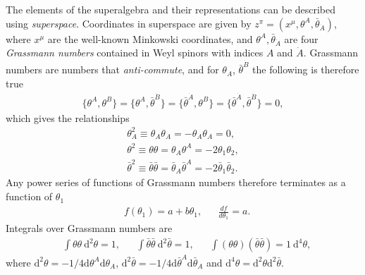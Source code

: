 \documentclass[twoside,english]{uiofysmaster}
\begin{document}
The elements of the superalgebra and their representations can be described using \textit{superspace}. Coordinates in superspace are given by $z^{\pi} = (x^{\mu}, \theta^A, \bar{\theta}_{\dot{A}})$, where $x^{\mu}$ are the well-known Minkowski coordinates, and $\theta^A, \bar{\theta}_{\dot{A}}$ are four \textit{Grassmann numbers} contained in Weyl spinors with indices $A$ and $\dot{A}$. Grassmann numbers are numbers that \textit{anti-commute}, and for $\theta_A$, $\bar{\theta}^{\dot{B}}$ the following is therefore true
\begin{align}
\{ \theta^A, \theta^B\} = \{ \theta^A, \bar{\theta}^{\dot{B}}\} = \{ \bar{\theta}^{\dot{A}}, \theta^B\} = \{ \bar{\theta}^{\dot{A}}, \bar{\theta}^{\dot{B}} \} =0,
\end{align}
which gives the relationships
\begin{align}
\theta_A^2 \equiv \theta_A \theta_A = - \theta_A \theta_A =  0,\\
\theta^2 \equiv \theta \theta = \theta_A \theta^A = -2 \theta_1 \theta_2,\\
\bar{\theta}^2 \equiv \bar{\theta} \bar{\theta} = \bar{\theta}_A \bar{\theta}^A = -2 \bar{\theta}_1 \bar{\theta}_2. 
\end{align}
Any power series of functions of Grassmann numbers therefore terminates as a function of $\theta_1$
\begin{align}
&f(\theta_1) = a + b \theta_1, && \frac{d f}{d \theta_1} = a.
\end{align}
Integrals over Grassmann numbers are 
\begin{align}
& \int \theta \theta~\mathrm{d}^2\theta=1, && \int \bar{\theta} \bar{\theta} ~ \mathrm{d}^2 \bar{\theta}=1, && \int (\theta \theta) (\bar{\theta} \bar{\theta})=1~\mathrm{d}^4 \theta,
\end{align}
where $\mathrm{d}^2\theta = - 1/4 \mathrm{d} \theta^A \mathrm{d}\theta_A$, $\mathrm{d}^2\bar{\theta} = - 1/4 \mathrm{d} \bar{\theta}^A \mathrm{d}\bar{\theta}_A$ and $\mathrm{d}^4 \theta = \mathrm{d}^2 \theta \mathrm{d}^2 \bar{\theta}$.





\end{document}

